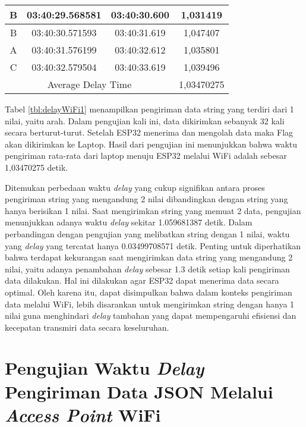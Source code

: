 \begin{longtable}{|ccc|c|}
  \multicolumn{1}{|c|}{B}    & \multicolumn{1}{c|}{03:40:29.568581} & 03:40:30.600       & 1,031419   \\ \hline
  \multicolumn{1}{|c|}{B}    & \multicolumn{1}{c|}{03:40:30.571593} & 03:40:31.619       & 1,047407   \\ \hline
  \multicolumn{1}{|c|}{A}    & \multicolumn{1}{c|}{03:40:31.576199} & 03:40:32.612       & 1,035801   \\ \hline
  \multicolumn{1}{|c|}{C}    & \multicolumn{1}{c|}{03:40:32.579504} & 03:40:33.619       & 1,039496   \\ \hline
  \multicolumn{3}{|c|}{Average Delay Time}                                               & 1,03470275 \\ \hline
  \end{longtable}

Tabel \ref{tbl:delayWiFi1} menampilkan pengiriman data string yang terdiri dari 1 nilai, yaitu arah. Dalam pengujian kali ini, data dikirimkan sebanyak 32 kali secara berturut-turut. Setelah ESP32 menerima dan mengolah data maka Flag akan dikirimkan ke Laptop. Hasil dari pengujian ini menunjukkan bahwa waktu pengiriman rata-rata dari laptop menuju ESP32 melalui WiFi adalah sebesar 1,03470275 detik.

Ditemukan perbedaan waktu \emph{delay} yang cukup signifikan antara proses pengiriman string yang mengandung 2 nilai dibandingkan dengan string yang hanya berisikan 1 nilai. Saat mengirimkan string yang memuat 2 data, pengujian menunjukkan adanya waktu \emph{delay} sekitar 1.059681387 detik. Dalam perbandingan dengan pengujian yang melibatkan string dengan 1 nilai, waktu yang \emph{delay} yang tercatat hanya 0.03499708571 detik. Penting untuk diperhatikan bahwa terdapat kekurangan saat mengirimkan data string yang mengandung 2 nilai, yaitu adanya penambahan \emph{delay} sebesar 1.3 detik setiap kali pengiriman data dilakukan. Hal ini dilakukan agar ESP32 dapat menerima data secara optimal. Oleh karena itu, dapat disimpulkan bahwa dalam konteks pengiriman data melalui WiFi, lebih disarankan untuk mengirimkan string dengan hanya 1 nilai guna menghindari \emph{delay} tambahan yang dapat mempengaruhi efisiensi dan kecepatan transmiri data secara keseluruhan.

\section{Pengujian Waktu \emph{Delay} Pengiriman Data JSON Melalui \emph{Access Point} WiFi}
\label{sec:delayWiFiJSON}

